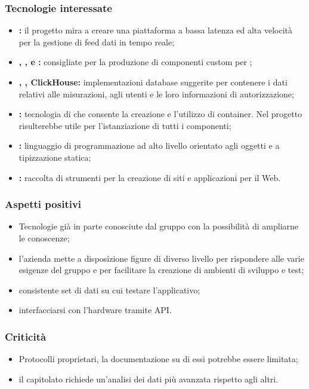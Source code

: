 	\subsubsection{Tecnologie interessate}
	\begin{itemize}
		\item \textbf{:} il progetto mira a creare una piattaforma a bassa latenza ed alta velocità per la gestione di feed dati in tempo reale;
		\item \textbf{, ,  e :}  consigliate per la produzione di componenti custom per ;
		\item \textbf{, , ClickHouse:} implementazioni database suggerite per contenere i dati relativi alle misurazioni, agli utenti e le loro informazioni di autorizzazione;
		\item \textbf{:} tecnologia di  che consente la creazione e l'utilizzo di container. Nel progetto risulterebbe utile per l'istanziazione di tutti i componenti;
		\item \textbf{:} linguaggio di programmazione ad alto livello orientato agli oggetti e a tipizzazione statica;
		\item \textbf{:} raccolta di strumenti  per la creazione di siti e applicazioni per il Web.
	\end{itemize}

	\subsubsection{Aspetti positivi}
	\begin{itemize}
		\item Tecnologie già in parte conosciute dal gruppo con la possibilità di ampliarne le conoscenze;
		\item l'azienda mette a disposizione figure di diverso livello per rispondere alle varie esigenze del gruppo e per facilitare la creazione di ambienti di sviluppo e test;
		\item consistente set di dati su cui testare l'applicativo;
		\item interfacciarsi con l'hardware tramite API.
	\end{itemize}

	\subsubsection{Criticità}
	\begin{itemize}
		\item Protocolli proprietari, la documentazione su di essi potrebbe essere limitata;
		\item il capitolato richiede un'analisi dei dati più avanzata rispetto agli altri.
	\end{itemize}

